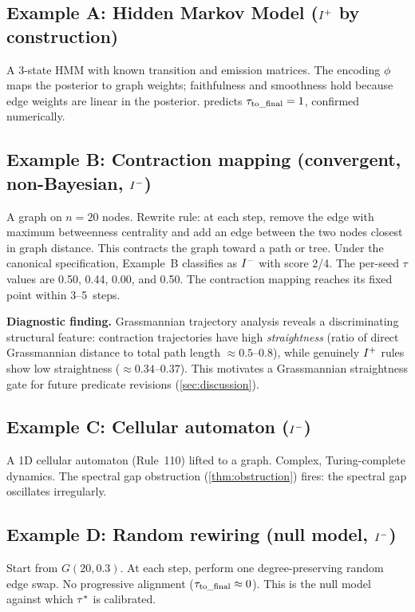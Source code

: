 \documentclass{../shared/primo}
\begin{document}
\subsection{Example A: Hidden Markov Model ($I\textsuperscript{+}$ by construction)}

A 3-state HMM with known transition and emission matrices. The encoding $\phi$ maps the posterior to graph weights; faithfulness and smoothness hold because edge weights are linear in the posterior.  predicts $\tau_{\mathrm{to\_final}} = 1$, confirmed numerically.

\subsection{Example B: Contraction mapping (convergent, non-Bayesian, $I\textsuperscript{$-$}$)}

A graph on $n = 20$ nodes. Rewrite rule: at each step, remove the edge with maximum betweenness centrality and add an edge between the two nodes closest in graph distance. This contracts the graph toward a path or tree. Under the canonical specification, Example~B classifies as $I\textsuperscript{$-$}$ with score 2/4. The per-seed $\tau$ values are 0.50, 0.44, 0.00, and 0.50. The contraction mapping reaches its fixed point within 3--5~steps.

\textbf{Diagnostic finding.} Grassmannian trajectory analysis reveals a discriminating structural feature: contraction trajectories have high \emph{straightness} (ratio of direct Grassmannian distance to total path length $\approx 0.5\text{--}0.8$), while genuinely $I\textsuperscript{+}$ rules show low straightness ($\approx 0.34\text{--}0.37$). This motivates a Grassmannian straightness gate for future predicate revisions (\cref{sec:discussion}).

\subsection{Example C: Cellular automaton ($I\textsuperscript{$-$}$)}

A 1D cellular automaton (Rule~110) lifted to a graph. Complex, Turing-complete dynamics. The spectral gap obstruction (\cref{thm:obstruction}) fires: the spectral gap oscillates irregularly.

\subsection{Example D: Random rewiring (null model, $I\textsuperscript{$-$}$)}

Start from $G(20, 0.3)$. At each step, perform one degree-preserving random edge swap. No progressive alignment ($\tau_{\mathrm{to\_final}} \approx 0$). This is the null model against which $\tau^*$ is calibrated.
\end{document}
